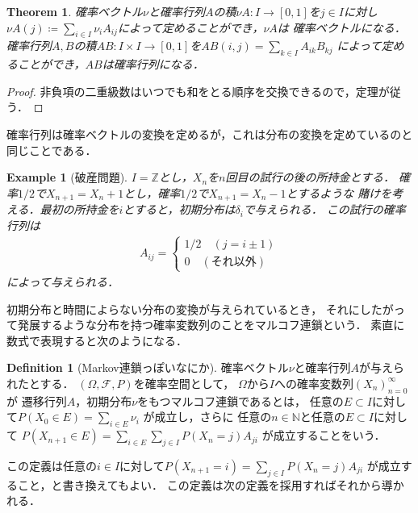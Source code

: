 \documentclass[dvipdfmx,autodetect-engine]{jsarticle}
\newtheorem{theorem}{Theorem}[section]
\newtheorem{example}{Example}[section]
\theoremstyle{remark}
\theoremstyle{definition}
\newtheorem{definition}{Definition}[section]
\newcommand{\N}{\mathbb{N}}
\newcommand{\Z}{\mathbb{Z}}
\begin{document}
\begin{theorem}
    確率ベクトル$\nu$と確率行列$A$の積$\nu A \colon I \to [0,1]$を$j \in I$に対し
    $\nu A (j) \coloneqq \sum_{i \in I} \nu_i A_{ij}$によって定めることができ，$\nu A$は
    確率ベクトルになる．
    確率行列$A,B$の積$AB \colon I\times I \to [0,1]$を$AB(i,j) = \sum_{k \in I} A_{ik}B_{kj}$
    によって定めることができ，$AB$は確率行列になる．
\end{theorem}


\begin{proof}
    非負項の二重級数はいつでも和をとる順序を交換できるので，定理が従う．
\end{proof}


確率行列は確率ベクトルの変換を定めるが，これは分布の変換を定めているのと
同じことである．

\begin{example}[破産問題]
    $I = \Z$とし，$X_n$を$n$回目の試行の後の所持金とする．
    確率$1/2$で$X_{n+1}=X_{n}+1$とし，確率$1/2$で$X_{n+1}=X_{n}-1$とするような
    賭けを考える．最初の所持金を$i$とすると，初期分布は$\delta_i$で与えられる．
    この試行の確率行列は
    \begin{align}
        A_{ij} = 
        \begin{cases}
            1/2 \quad (j = i \pm 1) \\
            0 \quad (\text{それ以外}) 
        \end{cases}
    \end{align}
    によって与えられる．
\end{example}


初期分布と時間によらない分布の変換が与えられているとき，
それにしたがって発展するような分布を持つ確率変数列のことをマルコフ連鎖という．
素直に数式で表現すると次のようになる．

\begin{definition}[Markov連鎖っぽいなにか]
    確率ベクトル$\nu$と確率行列$A$が与えられたとする．
    $(\Omega,\mathcal{F},P)$を確率空間として，
    $\Omega$から$I$への確率変数列$(X_n)_{n=0}^{\infty}$が
    遷移行列$A$，初期分布$\nu$をもつマルコフ連鎖であるとは，
    任意の$E \subset I$に対して$P(X_0 \in E) = \sum_{i \in E} \nu_{i}$
    が成立し，さらに
    任意の$n\in \N$と任意の$E \subset I$に対して
    $P(X_{n+1}\in E)=\sum_{i \in E} \sum_{j \in I} P(X_n = j) A_{ji}$
    が成立することをいう．
\end{definition}

この定義は任意の$i \in I$に対して$P(X_{n+1} = i)= \sum_{j \in I} P(X_n = j) A_{ji}$
が成立すること，と書き換えてもよい．
この定義は次の定義を採用すればそれから導かれる．
\end{document}
